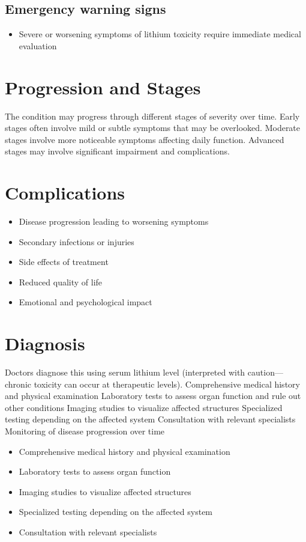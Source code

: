 \subsection{Emergency warning signs}
\begin{itemize}[noitemsep]
  \item Severe or worsening symptoms of lithium toxicity require immediate medical evaluation
\end{itemize}
\section{Progression and Stages}
The condition may progress through different stages of severity over time. Early stages often involve mild or subtle symptoms that may be overlooked. Moderate stages involve more noticeable symptoms affecting daily function. Advanced stages may involve significant impairment and complications.
\section{Complications}
\begin{itemize}[noitemsep]
  \item Disease progression leading to worsening symptoms
  \item Secondary infections or injuries
  \item Side effects of treatment
  \item Reduced quality of life
  \item Emotional and psychological impact
\end{itemize}
\section{Diagnosis}
Doctors diagnose this using serum lithium level (interpreted with caution---chronic toxicity can occur at therapeutic levels). Comprehensive medical history and physical examination Laboratory tests to assess organ function and rule out other conditions Imaging studies to visualize affected structures Specialized testing depending on the affected system Consultation with relevant specialists Monitoring of disease progression over time

\begin{itemize}[noitemsep]
  \item Comprehensive medical history and physical examination
  \item Laboratory tests to assess organ function
  \item Imaging studies to visualize affected structures
  \item Specialized testing depending on the affected system
  \item Consultation with relevant specialists
\end{itemize}

